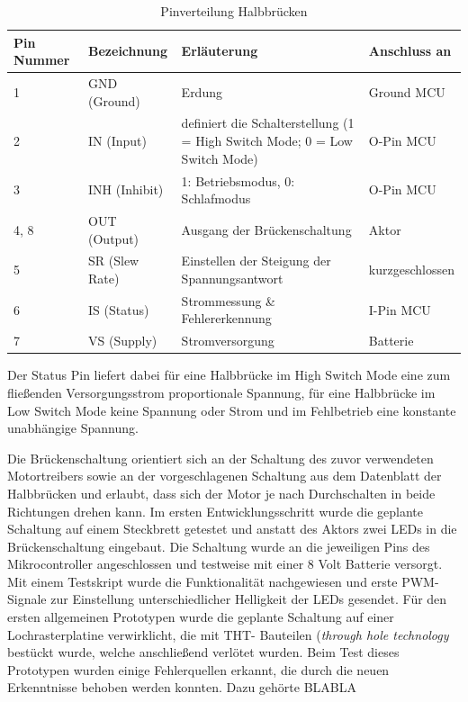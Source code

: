 \begin{table}[h]
	\centering
		\begin{tabular}{l|p{}|p{8cm}|p{3cm}}
			\textbf{Pin Nummer} & \textbf{Bezeichnung} & \textbf{Erläuterung} & \textbf{Anschluss an} \\ \hline
			1 & GND (Ground) & Erdung & Ground MCU \\
			2 & IN (Input) & definiert die Schalterstellung (1 = High Switch Mode; 0 = Low Switch Mode) & O-Pin MCU \\
			3 & INH (Inhibit) & 1: Betriebsmodus, 0: Schlafmodus & O-Pin MCU \\
			4, 8 & OUT (Output) & Ausgang der Brückenschaltung & Aktor \\
			5 & SR (Slew Rate) & Einstellen der Steigung der Spannungsantwort & kurzgeschlossen \\
			6 & IS (Status) & Strommessung \& Fehlererkennung & I-Pin MCU\\
			7 & VS (Supply) & Stromversorgung & Batterie\\
		\end{tabular}
	\caption{Pinverteilung Halbbrücken}
	\label{tab:Pinverteilung}
\end{table}
Der Status Pin liefert dabei für eine Halbbrücke im High Switch Mode eine zum fließenden Versorgungsstrom proportionale Spannung, für eine Halbbrücke im Low Switch Mode keine Spannung oder Strom und im Fehlbetrieb eine konstante unabhängige Spannung.


Die Brückenschaltung orientiert sich an der Schaltung des zuvor verwendeten Motortreibers sowie an der vorgeschlagenen Schaltung aus dem Datenblatt der Halbbrücken und erlaubt, dass sich der Motor je nach Durchschalten in beide Richtungen drehen kann.
Im ersten Entwicklungsschritt wurde die geplante Schaltung auf einem Steckbrett getestet und anstatt des Aktors zwei LEDs in die Brückenschaltung eingebaut. Die Schaltung wurde an die jeweiligen Pins des Mikrocontroller angeschlossen und testweise mit einer 8 Volt Batterie versorgt. Mit einem Testskript wurde die Funktionalität nachgewiesen und erste PWM-Signale zur Einstellung unterschiedlicher Helligkeit der LEDs gesendet.
Für den ersten allgemeinen Prototypen wurde die geplante Schaltung auf einer Lochrasterplatine verwirklicht, die mit THT- Bauteilen (\textit{through hole technology} bestückt wurde, welche anschließend verlötet wurden.  
Beim Test dieses Prototypen wurden einige Fehlerquellen erkannt, die durch die neuen Erkenntnisse behoben werden konnten. Dazu gehörte BLABLA